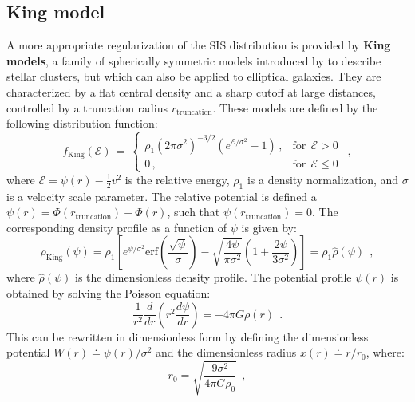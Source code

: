 \documentclass[fleqn,usenatbib]{mnras}
\begin{document}
\subsection{King model}\label{sec:King_model}
A more appropriate regularization of the SIS distribution is provided by \textbf{King models}, a family of spherically symmetric models introduced by \cite{King1966} to describe stellar clusters, but which can also be applied to elliptical galaxies.
They are characterized by a flat central density and a sharp cutoff at large distances, controlled by a truncation radius $r_\text{truncation}$.
These models are defined by the following distribution function:
\begin{equation}
    f_\text{King}(\mathcal{E}) \, = \, 
    \begin{cases}
      \rho_1 \left(2 \pi \sigma^2\right)^{-3/2} \left(e^{\mathcal{E}/\sigma^2} - 1\right) \, , &\text{for}\:\:\mathcal{E}>0\\
      0 \, , &\text{for}\:\:\mathcal{E} \leq 0
    \end{cases} \:\: ,
    \label{eq:king_distribution_function}
\end{equation}
where $\mathcal{E} = \psi(r) - \frac{1}{2} v^2$ is the relative energy, $\rho_1$ is a density normalization, and $\sigma$ is a velocity scale parameter.
The relative potential is defined a $\psi(r) = \Phi(r_\text{truncation}) - \Phi(r)$, such that $\psi(r_\text{truncation}) = 0$.
The corresponding density profile as a function of $\psi$ is given by:
{\fontsize{8.1pt}{8.1pt}\begin{equation}
    \rho_\text{King}(\psi) = \rho_1 \left[ e^{\psi/\sigma^2} \text{erf}\left(\dfrac{\sqrt{\psi}}{\sigma}\right) - \sqrt{\dfrac{4 \psi}{\pi \sigma^2}} \left(1+\dfrac{2 \psi}{3 \sigma^2}\right) \right] = \rho_1 \hat{\rho}(\psi) \:\:,
    \label{eq:king_density}
\end{equation}}
where $\hat{\rho}(\psi)$ is the dimensionless density profile.
The potential profile $\psi(r)$ is obtained by solving the Poisson equation:
\begin{equation}
    \dfrac{1}{r^2} \dfrac{d}{dr} \left(r^2 \dfrac{d\psi}{dr}\right) = -4 \pi G \rho(r) \:\: .
    \label{eq:king_poisson}
\end{equation}
This can be rewritten in dimensionless form by defining the dimensionless potential $W(r) \doteq \psi(r)/\sigma^2$ and the dimensionless radius $x(r) \doteq r/r_0$, where:
\begin{equation}
     r_0 = \sqrt{\dfrac{9 \sigma^2}{4 \pi G \rho_0}} \:\:,
    \label{eq:king_r0}
\end{equation}
\end{document}
